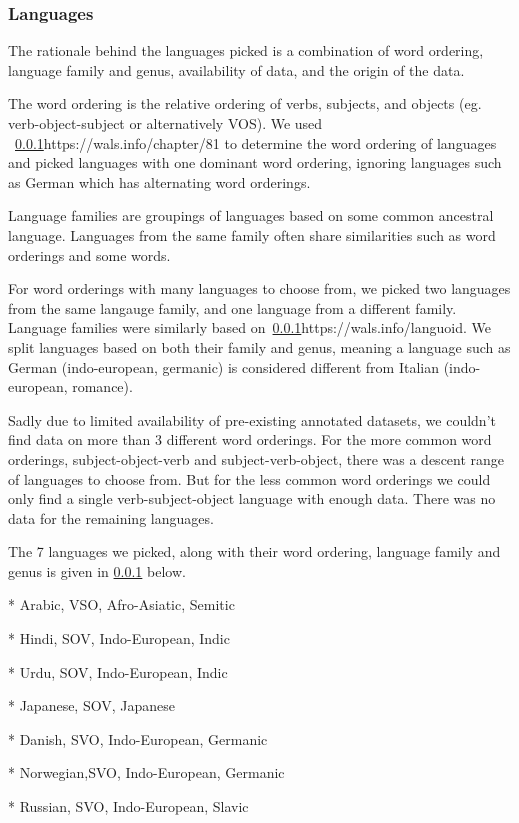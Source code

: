 \subsubsection{Languages}

The rationale behind the languages picked is a combination of word ordering,
language family and genus, availability of data, and the origin of the data.

The word ordering is the relative ordering of verbs, subjects, and objects (eg.
verb-object-subject or alternatively VOS). We used
~\ref{}{https://wals.info/chapter/81} to determine the word ordering of
languages and picked languages with one dominant word ordering, ignoring
languages such as German which has alternating word orderings. 

Language families are groupings of languages based on some common ancestral
language. Languages from the same family often share similarities such as word
orderings and some words. 

For word orderings with many languages to choose from, we picked two languages
from the same langauge family, and one language from a different family.
Language families were similarly based on~\ref{}{https://wals.info/languoid}. We
split languages based on both their family and genus, meaning a language such as
German (indo-european, germanic) is considered different from Italian
(indo-european, romance).

Sadly due to limited availability of pre-existing annotated datasets, we
couldn't find data on more than 3 different word orderings. For the more common
word orderings, subject-object-verb and subject-verb-object, there was a descent
range of languages to choose from. But for the less common word orderings we
could only find a single verb-subject-object language with enough data. There
was no data for the remaining languages. 

The 7 languages we picked, along with their word ordering, language family and
genus is given in \ref{} below.

* Arabic,   VSO, Afro-Asiatic, Semitic 

* Hindi,    SOV, Indo-European, Indic

* Urdu,     SOV, Indo-European, Indic

* Japanese, SOV, Japanese

* Danish,   SVO, Indo-European, Germanic

* Norwegian,SVO, Indo-European, Germanic

* Russian,  SVO, Indo-European, Slavic

